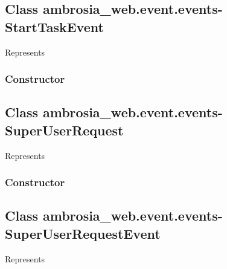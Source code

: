 \documentclass[letterpaper,10pt,english]{sphinxmanual}
\begin{document}
\subsection{Class ambrosia\_web.event.events-StartTaskEvent}
\label{ambrosia_web.event.events-StartTaskEvent:class-ambrosia-web-event-events-starttaskevent}\label{ambrosia_web.event.events-StartTaskEvent::doc}
Represents {\hyperref[ambrosia_plugins.lkm:ambrosia_plugins.lkm.events.StartTaskEvent]{}}


\subsubsection{Constructor}
\label{ambrosia_web.event.events-StartTaskEvent:constructor}

\begin{fulllineitems}
\label{ambrosia_web.event.events-StartTaskEvent:ambrosia_web.event.events-StartTaskEvent}
\end{fulllineitems}



\subsection{Class ambrosia\_web.event.events-SuperUserRequest}
\label{ambrosia_web.event.events-SuperUserRequest:class-ambrosia-web-event-events-superuserrequest}\label{ambrosia_web.event.events-SuperUserRequest::doc}
Represents 


\subsubsection{Constructor}
\label{ambrosia_web.event.events-SuperUserRequest:constructor}

\begin{fulllineitems}
\label{ambrosia_web.event.events-SuperUserRequest:ambrosia_web.event.events-SuperUserRequest}
\end{fulllineitems}



\subsection{Class ambrosia\_web.event.events-SuperUserRequestEvent}
\label{ambrosia_web.event.events-SuperUserRequestEvent::doc}\label{ambrosia_web.event.events-SuperUserRequestEvent:class-ambrosia-web-event-events-superuserrequestevent}
Represents {\hyperref[ambrosia_plugins.lkm:ambrosia_plugins.lkm.events.SuperUserRequestEvent]{}}
\end{document}
